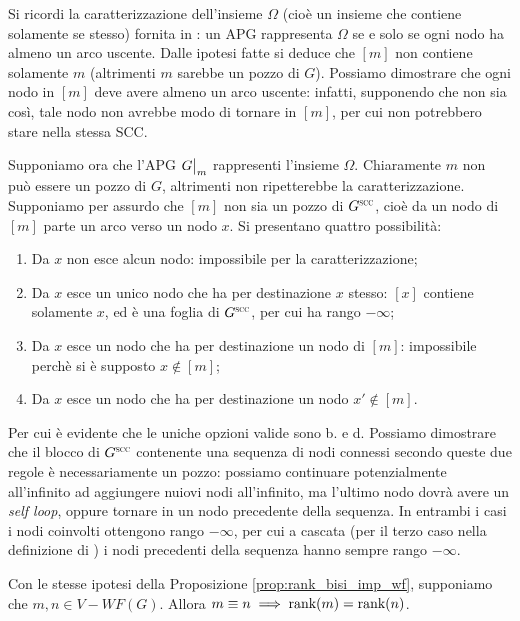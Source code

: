 \begin{proof2}
    Si ricordi la caratterizzazione dell'insieme $\Omega$ (cioè un insieme che contiene solamente se stesso) fornita in \cite{aczel}: un APG rappresenta $\Omega$ se e solo se ogni nodo ha almeno un arco uscente. Dalle ipotesi fatte si deduce che $[m]$ non contiene solamente $m$ (altrimenti $m$ sarebbe un pozzo di $G$). Possiamo dimostrare che ogni nodo in $[m]$ deve avere almeno un arco uscente: infatti, supponendo che non sia così, tale nodo non avrebbe modo di tornare in $[m]$, per cui non potrebbero stare nella stessa SCC.

    Supponiamo ora che l'APG $\restr{G}{m}$ rappresenti l'insieme $\Omega$. Chiaramente $m$ non può essere un pozzo di $G$, altrimenti non ripetterebbe la caratterizzazione. Supponiamo per assurdo che $[m]$ non sia un pozzo di $G^{\superscc}$, cioè da un nodo di $[m]$ parte un arco verso un nodo $x$. Si presentano quattro possibilità:
    \begin{enumerate}
        \item Da $x$ non esce alcun nodo: impossibile per la caratterizzazione;
        \item Da $x$ esce un unico nodo che ha per destinazione $x$ stesso: $[x]$ contiene solamente $x$, ed è una foglia di $G^{\superscc}$, per cui ha rango $-\infty$;
        \item Da $x$ esce un nodo che ha per destinazione un nodo di $[m]$: impossibile perchè si è supposto $x \not\in [m]$;
        \item Da $x$ esce un nodo che ha per destinazione un nodo $x' \not\in [m]$.
    \end{enumerate}
    Per cui è evidente che le uniche opzioni valide sono b. e d. Possiamo dimostrare che il blocco di $G^{\superscc}$ contenente una sequenza di nodi connessi secondo queste due regole è necessariamente un pozzo: possiamo continuare potenzialmente all'infinito ad aggiungere nuiovi nodi all'infinito, ma l'ultimo nodo dovrà avere un \emph{self loop}, oppure tornare in un nodo precedente della sequenza. In entrambi i casi i nodi coinvolti ottengono rango $-\infty$, per cui a cascata (per il terzo caso nella definizione di \rankfunc) i nodi precedenti della sequenza hanno sempre rango $-\infty$.
\end{proof2}
\begin{proposition}
    Con le stesse ipotesi della Proposizione \ref{prop:rank_bisi_imp_wf}, supponiamo che $m,n \in V - WF(G)$. Allora $m \equiv n \implies \textup{rank}(m) = \textup{rank}(n)$.
\end{proposition}
